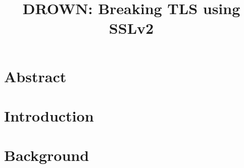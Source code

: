\documentclass[letterpaper,twocolumn,10pt]{article}
\theoremstyle{plain}
\newif\ifblind\blindtrue
\begin{document}
\thispagestyle{empty}

\title{DROWN: Breaking TLS using SSLv2}
\ifblind
\author{}
\else
\author[1]{Nimrod Aviram}
\author[2]{Sebastian Schinzel}
\author[3]{Juraj Somorovsky}
\author[4]{Nadia Heninger}
\author[2]{Maik Dankel}
\author[5]{Jens~Steube}
\author[4]{Luke Valenta}
\author[6]{David Adrian}
\author[6]{J. Alex Halderman}
\author[7]{Viktor Dukhovni}
\author[8]{Emilia~K\"asper}
\author[4]{Shaanan Cohney}
\author[3]{Susanne Engels}
\author[3]{Christof Paar}
\author[1]{Yuval Shavitt}
\affil[1]{Department of Electrical Engineering, Tel Aviv University}
\affil[2]{M\"unster University of Applied Sciences}
\affil[3]{Horst G\"ortz Institute for IT Security, Ruhr University Bochum}
\affil[4]{University of Pennsylvania}
\affil[5]{Hashcat Project}
\affil[6]{University of Michigan}
\affil[7]{Two Sigma/OpenSSL}
\affil[8]{Google/OpenSSL}

\renewcommand\Affilfont{\fontsize{10}{12}\selectfont}

\renewcommand\Authands{ and }
\fi


\maketitle

\newif\ifsubmit\submittrue %

\newcommand{\twolinecell}[2][r]{%
\begin{tabular}[#1]{@{}c@{}}#2\end{tabular}}



\section*{Abstract}


\section{Introduction}


\section{Background}

\end{document}
